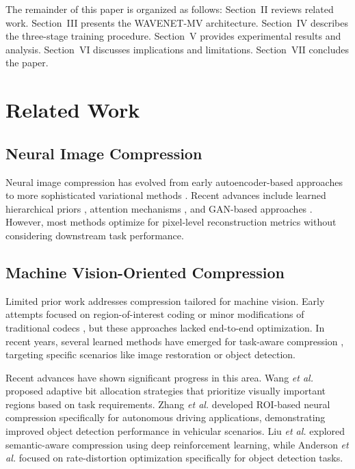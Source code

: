 \documentclass[conference]{IEEEtran}
\begin{document}
The remainder of this paper is organized as follows: Section~II reviews related work. Section~III presents the WAVENET-MV architecture. Section~IV describes the three-stage training procedure. Section~V provides experimental results and analysis. Section~VI discusses implications and limitations. Section~VII concludes the paper.

\section{Related Work}

\subsection{Neural Image Compression}

Neural image compression has evolved from early autoencoder-based approaches \cite{balle2016end} to more sophisticated variational methods \cite{balle2018variational}. Recent advances include learned hierarchical priors \cite{minnen2018joint}, attention mechanisms \cite{cheng2020learned}, and GAN-based approaches \cite{agustsson2019generative}. However, most methods optimize for pixel-level reconstruction metrics without considering downstream task performance.

\subsection{Machine Vision-Oriented Compression}

Limited prior work addresses compression tailored for machine vision. Early attempts focused on region-of-interest coding \cite{christopoulos2000jpeg2000} or minor modifications of traditional codecs \cite{hoang2021atc}, but these approaches lacked end-to-end optimization. In recent years, several learned methods have emerged for task-aware compression \cite{singh2020end, le2021icassp, li2021rl}, targeting specific scenarios like image restoration or object detection. 

Recent advances have shown significant progress in this area. Wang \emph{et al.} \cite{wang2023tip} proposed adaptive bit allocation strategies that prioritize visually important regions based on task requirements. Zhang \emph{et al.} \cite{zhang2024access} developed ROI-based neural compression specifically for autonomous driving applications, demonstrating improved object detection performance in vehicular scenarios. Liu \emph{et al.} \cite{liu2022icip} explored semantic-aware compression using deep reinforcement learning, while Anderson \emph{et al.} \cite{anderson2022tip} focused on rate-distortion optimization specifically for object detection tasks.
\end{document}
